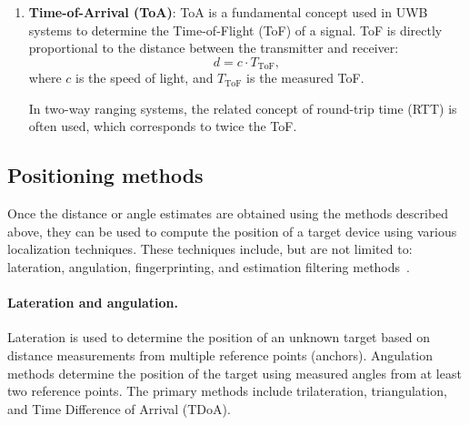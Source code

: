 \begin{enumerate}
    \item \textbf{Time-of-Arrival (ToA)}: ToA is a fundamental concept used in UWB systems to determine the Time-of-Flight (ToF) of a signal. ToF is directly proportional to the distance between the transmitter and receiver:
    \begin{equation}
    d = c \cdot T_{\text{ToF}},
    \end{equation}
    where $c$ is the speed of light, and $T_{\text{ToF}}$ is the measured ToF.
    
    In two-way ranging systems, the related concept of round-trip time (RTT) is often used, which corresponds to twice the ToF.
\end{enumerate}

\subsection{Positioning methods}
Once the distance or angle estimates are obtained using the methods described above, they can be used to compute the position of a target device using various localization techniques. These techniques include, but are not limited to: lateration, angulation, fingerprinting, and estimation filtering methods~\cite{qi2024current}.

\paragraph{Lateration and angulation.}
Lateration is used to determine the position of an unknown target based on distance measurements from multiple reference points (anchors). Angulation methods determine the position of the target using measured angles from at least two reference points.
The primary methods include trilateration, triangulation, and Time Difference of Arrival (TDoA).

